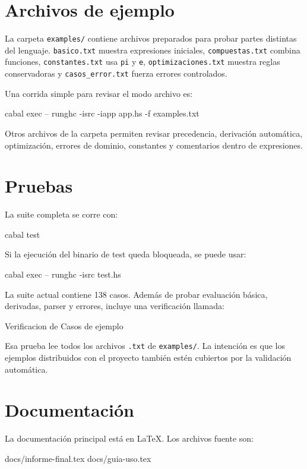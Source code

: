 \documentclass[11pt,a4paper]{article}
\newenvironment{codeblock}{\verbatim}{\endverbatim}
\begin{document}
\section{Archivos de ejemplo}

La carpeta \texttt{examples/} contiene archivos preparados para probar partes distintas del lenguaje. \texttt{basico.txt} muestra expresiones iniciales, \texttt{compuestas.txt} combina funciones, \texttt{constantes.txt} usa \texttt{pi} y \texttt{e}, \texttt{optimizaciones.txt} muestra reglas conservadoras y \texttt{casos\_error.txt} fuerza errores controlados.

Una corrida simple para revisar el modo archivo es:

\begin{codeblock}
cabal exec -- runghc -isrc -iapp app\Main.hs -f examples\basico.txt
\end{codeblock}

Otros archivos de la carpeta permiten revisar precedencia, derivación automática, optimización, errores de dominio, constantes y comentarios dentro de expresiones.

\section{Pruebas}

La suite completa se corre con:

\begin{codeblock}
cabal test
\end{codeblock}

Si la ejecución del binario de test queda bloqueada, se puede usar:

\begin{codeblock}
cabal exec -- runghc -isrc test\TestSuite.hs
\end{codeblock}

La suite actual contiene 138 casos. Además de probar evaluación básica, derivadas, parser y errores, incluye una verificación llamada:

\begin{codeblock}
Verificacion de Casos de ejemplo
\end{codeblock}

Esa prueba lee todos los archivos \texttt{.txt} de \texttt{examples/}. La intención es que los ejemplos distribuidos con el proyecto también estén cubiertos por la validación automática.

\section{Documentación}

La documentación principal está en LaTeX. Los archivos fuente son:

\begin{codeblock}
docs/informe-final.tex
docs/guia-uso.tex
\end{codeblock}
\end{document}
